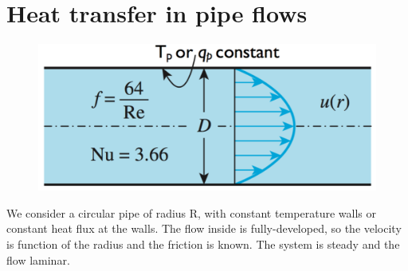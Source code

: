 \section{Heat transfer in pipe flows}
	\begin{figure}
	\vspace{-5mm}
	\includegraphics[scale=0.3]{ch5/6}
	\end{figure}			
	We consider a circular pipe of radius R, with constant temperature walls or constant heat flux at the walls. The flow inside is fully-developed, so the velocity is function of the radius and the friction is known. The system is steady and the flow laminar. 
